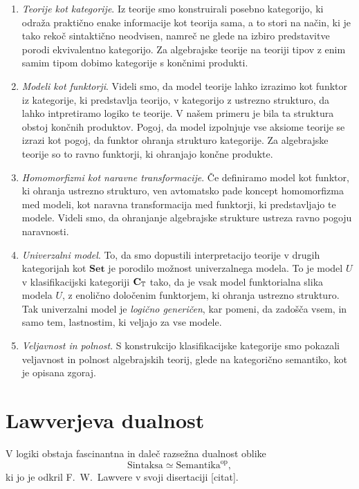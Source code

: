 \documentclass[../kategoricna_logika.tex]{subfiles}
\begin{document}
\begin{enumerate}
\item \emph{Teorije kot kategorije}. Iz teorije smo konstruirali posebno
  kategorijo, ki odraža praktično enake informacije kot teorija sama,
  a to stori na način, ki je tako rekoč sintaktično neodvisen, namreč
  ne glede na izbiro predstavitve porodi ekvivalentno kategorijo.
  Za algebrajske teorije na teoriji tipov z enim samim tipom dobimo
  kategorije s končnimi produkti.
\item \emph{Modeli kot funktorji}. Videli smo, da model teorije lahko izrazimo
  kot funktor iz kategorije, ki predstavlja teorijo, v kategorijo z ustrezno
  strukturo, da lahko intpretiramo logiko te teorije. V našem primeru
  je bila ta struktura obstoj končnih produktov. Pogoj, da model izpolnjuje
  vse aksiome teorije se izrazi kot pogoj, da funktor ohranja strukturo
  kategorije. Za algebrajske teorije so to ravno funktorji, ki ohranjajo
  končne produkte.
\item \emph{Homomorfizmi kot naravne transformacije}. Če definiramo model
  kot funktor, ki ohranja ustrezno strukturo, ven avtomatsko pade koncept
  homomorfizma med modeli, kot naravna transformacija med funktorji, ki
  predstavljajo te modele. Videli smo, da ohranjanje algebrajske strukture
  ustreza ravno pogoju naravnosti.
\item \emph{Univerzalni model}. To, da smo dopustili interpretacijo teorije
  v drugih kategorijah kot $\mathbf{Set}$ je porodilo možnost univerzalnega
  modela. To je model $U$ v klasifikacijski kategoriji ${\operatorname{\mathbf{C}}}_{\mathbb{T}}$ tako,
  da je vsak model funktorialna slika modela $U$, z enolično določenim
  funktorjem, ki ohranja ustrezno strukturo. Tak univerzalni model je
  \emph{logično generičen}, kar pomeni, da zadošča vsem, in samo tem,
  lastnostim, ki veljajo za vse modele.
\item \emph{Veljavnost in polnost}. S konstrukcijo klasifikacijske kategorije
  smo pokazali veljavnost in polnost algebrajskih teorij, glede na
  kategorično semantiko, kot je opisana zgoraj.
\end{enumerate}
% 
%
%
\section{Lawverjeva dualnost}
%
V logiki obstaja fascinantna in daleč razsežna dualnost oblike
\[ \mathrm{Sintaksa} \simeq \mathrm{Semantika}^{\mathrm{op}}, \]
ki jo je odkril F.~W.~Lawvere v svoji disertaciji [citat].
\end{document}
